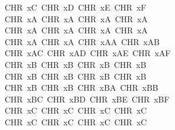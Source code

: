\begin{isabellebody}
\ \ \ \ CHR\ {}x{}C{\isacharcomma}{\kern0pt}\ CHR\ {}x{}D{\isacharcomma}{\kern0pt}\ CHR\ {}x{}E{\isacharcomma}{\kern0pt}\ CHR\ {}x{}F{\isacharcomma}{\kern0pt}\isanewline
\ \ \ \ CHR\ {}xA{}{\isacharcomma}{\kern0pt}\ CHR\ {}xA{}{\isacharcomma}{\kern0pt}\ CHR\ {}xA{}{\isacharcomma}{\kern0pt}\ CHR\ {}xA{}{\isacharcomma}{\kern0pt}\isanewline
\ \ \ \ CHR\ {}xA{}{\isacharcomma}{\kern0pt}\ CHR\ {}xA{}{\isacharcomma}{\kern0pt}\ CHR\ {}xA{}{\isacharcomma}{\kern0pt}\ CHR\ {}xA{}{\isacharcomma}{\kern0pt}\isanewline
\ \ \ \ CHR\ {}xA{}{\isacharcomma}{\kern0pt}\ CHR\ {}xA{}{\isacharcomma}{\kern0pt}\ CHR\ {}xAA{\isacharcomma}{\kern0pt}\ CHR\ {}xAB{\isacharcomma}{\kern0pt}\isanewline
\ \ \ \ CHR\ {}xAC{\isacharcomma}{\kern0pt}\ CHR\ {}xAD{\isacharcomma}{\kern0pt}\ CHR\ {}xAE{\isacharcomma}{\kern0pt}\ CHR\ {}xAF{\isacharcomma}{\kern0pt}\isanewline
\ \ \ \ CHR\ {}xB{}{\isacharcomma}{\kern0pt}\ CHR\ {}xB{}{\isacharcomma}{\kern0pt}\ CHR\ {}xB{}{\isacharcomma}{\kern0pt}\ CHR\ {}xB{}{\isacharcomma}{\kern0pt}\isanewline
\ \ \ \ CHR\ {}xB{}{\isacharcomma}{\kern0pt}\ CHR\ {}xB{}{\isacharcomma}{\kern0pt}\ CHR\ {}xB{}{\isacharcomma}{\kern0pt}\ CHR\ {}xB{}{\isacharcomma}{\kern0pt}\isanewline
\ \ \ \ CHR\ {}xB{}{\isacharcomma}{\kern0pt}\ CHR\ {}xB{}{\isacharcomma}{\kern0pt}\ CHR\ {}xBA{\isacharcomma}{\kern0pt}\ CHR\ {}xBB{\isacharcomma}{\kern0pt}\isanewline
\ \ \ \ CHR\ {}xBC{\isacharcomma}{\kern0pt}\ CHR\ {}xBD{\isacharcomma}{\kern0pt}\ CHR\ {}xBE{\isacharcomma}{\kern0pt}\ CHR\ {}xBF{\isacharcomma}{\kern0pt}\isanewline
\ \ \ \ CHR\ {}xC{}{\isacharcomma}{\kern0pt}\ CHR\ {}xC{}{\isacharcomma}{\kern0pt}\ CHR\ {}xC{}{\isacharcomma}{\kern0pt}\ CHR\ {}xC{}{\isacharcomma}{\kern0pt}\isanewline
\ \ \ \ CHR\ {}xC{}{\isacharcomma}{\kern0pt}\ CHR\ {}xC{}{\isacharcomma}{\kern0pt}\ CHR\ {}xC{}{\isacharcomma}{\kern0pt}\ CHR\ {}xC{}{\isacharcomma}{\kern0pt}\isanewline

\end{isabellebody}
